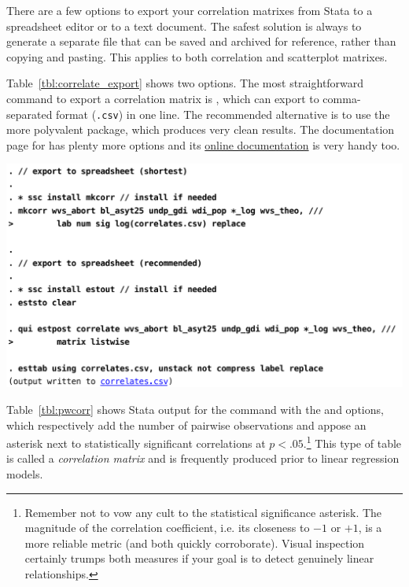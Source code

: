 There are a few options to export your correlation matrixes from Stata to a spreadsheet editor or to a text document. The safest solution is always to generate a separate file that can be saved and archived for reference, rather than copying and pasting. This applies to both correlation and scatterplot matrixes.

Table~\ref{tbl:correlate_export} shows two options. The most straightforward command to export a correlation matrix is , which can export to comma-separated format (\texttt{.csv}) in one line. The recommended alternative is to use the more polyvalent  package, which produces very clean results. The documentation page for  has plenty more options and its \href{http://repec.org/bocode/e/estout/estpost.html#estpost112}{online documentation} is very handy too.

\begin{table}[htp]
	\includegraphics[scale=.5]{images/correlate_export.pdf}

	\caption[Exporting a correlation matrix with  and ]{\label{tbl:correlate_export}%
	Exporting a correlation matrix with  and . %
  See \texttt{help estout} and related online documentation for options. %
	\qog}
\end{table}%

Table~\ref{tbl:pwcorr} shows Stata output for the  command with the  and  options, which respectively add the number of pairwise observations and appose an asterisk next to statistically significant correlations at $p < .05$.\footnote{Remember not to vow any cult to the statistical significance asterisk. The magnitude of the correlation coefficient, i.e. its closeness to $-1$ or $+1$, is a more reliable metric (and both quickly corroborate). Visual inspection certainly trumps both measures if your goal is to detect genuinely linear relationships.} This type of table is called a \emph{correlation matrix} and is frequently produced prior to linear regression models.

